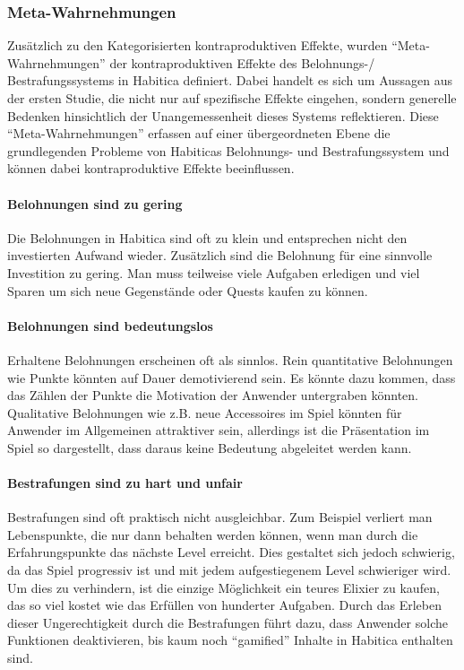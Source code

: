 \documentclass[sigconf, nonacm]{acmart}
\begin{document}
\subsubsection{Meta-Wahrnehmungen}
Zusätzlich zu den Kategorisierten kontraproduktiven Effekte, wurden \enquote{Meta-Wahrnehmungen} der kontraproduktiven Effekte des Belohnungs-/ Bestrafungssystems in Habitica definiert. Dabei handelt es sich um Aussagen aus der ersten Studie, die nicht nur auf spezifische Effekte eingehen, sondern generelle Bedenken hinsichtlich der Unangemessenheit dieses Systems reflektieren. Diese \enquote{Meta-Wahrnehmungen} erfassen auf einer übergeordneten Ebene die grundlegenden Probleme von Habiticas Belohnungs- und Bestrafungssystem und können dabei kontraproduktive Effekte beeinflussen.

\paragraph{Belohnungen sind zu gering}\label{sec:acpe1}
Die Belohnungen in Habitica sind oft zu klein und entsprechen nicht den investierten Aufwand wieder. Zusätzlich sind die Belohnung für eine sinnvolle Investition zu gering. Man muss teilweise viele Aufgaben erledigen und viel Sparen um sich neue Gegenstände oder Quests kaufen zu können.

\paragraph{Belohnungen sind bedeutungslos}\label{sec:acpe2}
Erhaltene Belohnungen erscheinen oft als sinnlos. Rein quantitative Belohnungen wie Punkte könnten auf Dauer demotivierend sein. Es könnte dazu kommen, dass das Zählen der Punkte die Motivation der Anwender untergraben könnten. Qualitative Belohnungen wie z.B. neue Accessoires im Spiel könnten für Anwender im Allgemeinen attraktiver sein, allerdings ist die Präsentation im Spiel so dargestellt, dass daraus keine Bedeutung abgeleitet werden kann.

\paragraph{Bestrafungen sind zu hart und unfair}\label{sec:acpe3}
Bestrafungen sind oft praktisch nicht ausgleichbar. Zum Beispiel verliert man Lebenspunkte, die nur dann behalten werden können, wenn man durch die Erfahrungspunkte das nächste Level erreicht. Dies gestaltet sich jedoch schwierig, da das Spiel progressiv ist und mit jedem aufgestiegenem Level schwieriger wird. Um dies zu verhindern, ist die einzige Möglichkeit ein teures Elixier zu kaufen, das so viel kostet wie das Erfüllen von hunderter Aufgaben. Durch das Erleben dieser Ungerechtigkeit durch die Bestrafungen führt dazu, dass Anwender solche Funktionen deaktivieren, bis kaum noch \enquote{gamified} Inhalte in Habitica enthalten sind.
\end{document}
